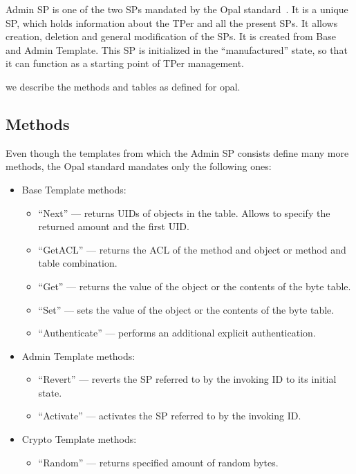 
Admin SP is one of the two SPs mandated by the Opal standard~\cite{tcg-opal2}. It is a unique SP, which holds information about the TPer and all the present SPs. It allows creation, deletion and general modification of the SPs.
It is created from Base and Admin Template.
This SP is initialized in the ``manufactured'' state, so that it can function as a starting point of TPer management.

we describe the methods and tables as defined for opal.




\subsection{Methods}

Even though the templates from which the Admin SP consists define many more methods, the Opal standard mandates only the following ones:
\begin{itemize}
    \item Base Template methods:
\begin{itemize}
\item ``Next'' --- returns UIDs of objects in the table. Allows to specify the returned amount and the first UID.
\item ``GetACL'' --- returns the ACL of the method and object or method and table combination.
\item ``Get'' --- returns the value of the object or the contents of the byte table.
\item ``Set'' --- sets the value of the object or the contents of the byte table.
\item ``Authenticate'' --- performs an additional explicit authentication.
\end{itemize}
    \item Admin Template methods:
\begin{itemize}
\item ``Revert'' --- reverts the SP referred to by the invoking ID to its initial state.
\item ``Activate'' --- activates the SP referred to by the invoking ID.
\end{itemize}
    \item Crypto Template methods:
\begin{itemize}
\item ``Random'' --- returns specified amount of random bytes.
\end{itemize}
\end{itemize}


